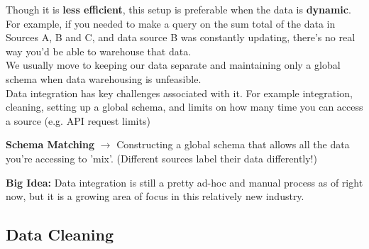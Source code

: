 \documentclass[english, 10pt]{article}
\begin{document}
{


}

\hfill \break Though it is \textbf{less efficient}, this setup is preferable when the data is \textbf{dynamic}.\\

For example, if you needed to make a query on the sum total of the data in Sources A, B and C, and data source B was constantly updating, there's no real way you'd be able to warehouse that data.\\

We usually move to keeping our data separate and maintaining only a global schema when data warehousing is unfeasible.\\

Data integration has key challenges associated with it. For example integration, cleaning, setting up a global schema, and limits on how many time you can access a source (e.g. API request limits)\\

\begin{tcolorbox}[title=Definition:,colframe=red!75!black,colback=red!5!white,arc=0pt,fonttitle=\bfseries]
\textbf{Schema Matching} $\rightarrow$ Constructing a global schema that allows all the data you're accessing to 'mix'. (Different sources label their data differently!)
\end{tcolorbox}

\hfill \break \textbf{Big Idea:} Data integration is still a pretty ad-hoc and manual process as of right now, but it is a growing area of focus in this relatively new industry.\\

\subsection{Data Cleaning}
\end{document}
